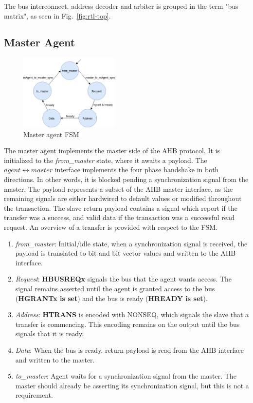 The bus interconnect, address decoder and arbiter is grouped in the term "bus matrix", as seen in Fig.~\ref{fig:rtl-top}.\par   

\newpage
\subsection{Master Agent}
\label{sub:magt-rtl}
\begin{figure}
\includegraphics[width=5cm]{figs/hw/mAgent_FSM.png}
\caption{Master agent FSM}\label{fig:rafsm}
\end{figure}  

The master agent implements the master side of the AHB protocol. It is initialized to the \textit{from\_master} state, where it awaits a payload. The $agent\leftrightarrow master$ interface implements the four phase handshake in both directions. In other words, it is blocked pending a synchronization signal from the master. The payload represents a subset of the AHB master interface, as the remaining signals are either hardwired to default values or modified throughout the transaction. The slave return payload contains a signal which report if the transfer was a success, and valid data if the transaction was a successful read request. An overview of a transfer is provided with respect to the FSM.
\begin{enumerate}
 \item \textit{from\_master}: Initial/idle state, when a synchronization signal is received, the payload is translated to bit and bit vector values and written to the AHB interface.
 \item \textit{Request}: \textbf{HBUSREQx} signals the bus that the agent wants access. The signal remains asserted until the agent is granted access to the bus (\textbf{HGRANTx is set}) and the bus is ready (\textbf{HREADY is set}).
 \item \textit{Address}: \textbf{HTRANS} is encoded with NONSEQ, which signals the slave that a transfer is commencing. This encoding remains on the output until the bus signals that it is ready.
 \item \textit{Data}: When the bus is ready, return payload is read from the AHB interface and written to the master.
 \item \textit{to\_master}: Agent waits for a synchronization signal from the master. The master should already be asserting its synchronization signal, but this is not a requirement.   
\end{enumerate}

